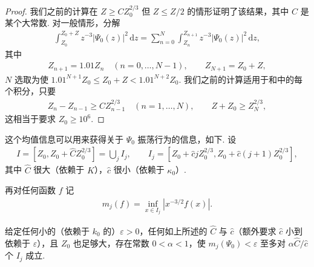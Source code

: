 \begin{proof}
我们之前的计算在 $Z \geq CZ_0^{2/3}$ 但 $Z \leq Z/2$ 的情形证明了该结果，其中 $C$ 是某个大常数. 对一般情形，分解
\begin{align*}
  \int_{Z_{0}}^{Z_{0}+Z}z^{-3}\left|\Psi_{0}(z)\right|^{2}\,\mathrm{d}z
  =\sum_{n=0}^{N}\int_{Z_{n}}^{Z_{n+1}}z^{-3}\left|\Psi_{0}(z)\right|^{2}\,\mathrm{d}z,
\end{align*}
其中
\begin{align*}
  Z_{n+1}=1.01Z_{n}\quad (n=0,\ldots,N-1),\qquad Z_{N+1}=Z_{0}+Z,
\end{align*}
$N$ 选取为使 $1.01^{N+1}Z_0 \leq Z_0 + Z < 1.01^{N+2}Z_0$. 我们之前的计算适用于和中的每个积分，只要
\begin{align*}
  Z_{n}-Z_{n-1}\geq C Z_{n-1}^{2/3}\quad (n=1,\ldots,N),\qquad
  Z+Z_{0}\geq Z_{N}^{2/3},
\end{align*}
这相当于要求 $Z_0 \geq 10^6$.
\end{proof}

这个均值信息可以用来获得关于 $\Psi_{0}$ 振荡行为的信息，如下. 设
\begin{align*}
  I=[Z_{0},Z_{0}+\hat{C}Z_{0}^{2/3}]=\bigcup_{j}I_{j},
  \qquad
  I_{j}=[Z_{0}+\hat{c}jZ_{0}^{2/3},Z_{0}+\hat{c}\left(j+1\right)Z_{0}^{2/3}],
\end{align*}
其中 $\hat{C}$ 很大（依赖于 $K$），$\hat{c}$ 很小（依赖于 $\kappa_{0}$）.

再对任何函数 $f$ 记
\begin{align*}
  m_{j}(f)=\inf_{x\in I_{j}}|x^{-3/2}f(x)|.
\end{align*}

\begin{corollary}\label{cor:9.24}
给定任何小的（依赖于 $k_0$ 的）$\varepsilon > 0$，任何如上所述的 $\hat{C}$ 与 $\hat{c}$（额外要求 $\hat{c}$ 小到依赖于 $\varepsilon$），且 $Z_0$ 也足够大，存在常数 $0 < \alpha < 1$，使 $m_j(\Psi_0) < \varepsilon$ 至多对 $\alpha\hat{C}/\hat{c}$ 个 $I_j$ 成立.
\end{corollary}

